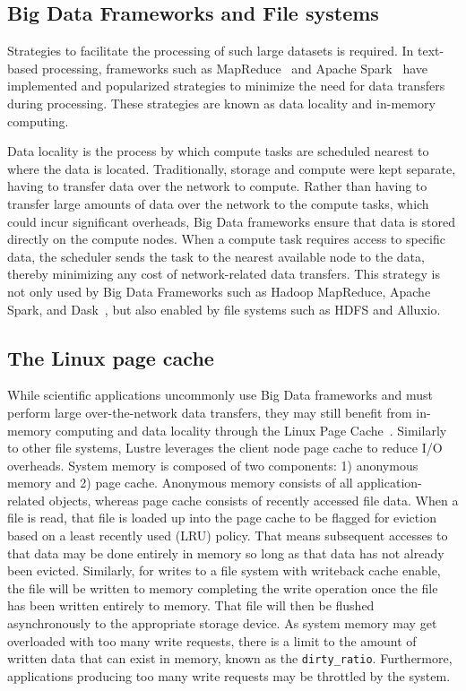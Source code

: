 \subsection{Big Data Frameworks and File systems}

      Strategies to facilitate the processing of such large datasets is
      required. In text-based processing, frameworks such as
      MapReduce~\cite{dean2008mapreduce} and Apache
      Spark~\cite{zaharia2016apache} have implemented and popularized strategies
      to minimize the need for data transfers during processing. These
      strategies are known as data locality and in-memory computing.

      Data locality is the process by which compute tasks are scheduled nearest
      to where the data is located. Traditionally, storage and compute were kept
      separate, having to transfer data over the network to compute. Rather than
      having to transfer large amounts of data over the network to the compute
      tasks, which could incur significant overheads, Big Data frameworks ensure
      that data is stored directly on the compute nodes. When a compute task
      requires access to specific data, the scheduler sends the task to the
      nearest available node to the data, thereby minimizing any cost of
      network-related data transfers. This strategy is not only used by Big Data
      Frameworks such as Hadoop MapReduce, Apache Spark, and
      Dask~\cite{rocklin2015dask}, but also enabled by file systems such as HDFS
      and Alluxio.



\subsection{The Linux page cache}
 While scientific applications uncommonly use Big Data frameworks and must
      perform large over-the-network data transfers, they may still benefit from
      in-memory computing and data locality through the Linux Page
      Cache~\cite{pagecache}. Similarly to other file systems, Lustre leverages
      the client node page cache to reduce I/O overheads. System memory is
      composed of two components: 1) anonymous memory and 2) page cache.
      Anonymous memory consists of all application-related objects, whereas page
      cache consists of recently accessed file data. When a file is read, that
      file is loaded up into the page cache to be flagged for eviction based on
      a least recently used (LRU) policy. That means subsequent accesses to that
      data may be done entirely in memory so long as that data has not already
      been evicted. Similarly, for writes to a file system with writeback cache
      enable, the file will be written to memory completing the write operation
      once the file has been written entirely to memory. That file will then be
      flushed asynchronously to the appropriate storage device. As system memory
      may get overloaded with too many write requests, there is a limit to the
      amount of written data that can exist in memory, known as the
      \texttt{dirty\_ratio}. Furthermore, applications producing too many write
      requests may be throttled by the system.

